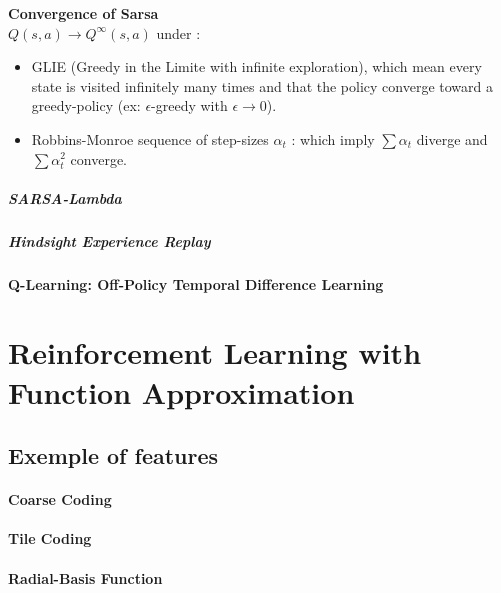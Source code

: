 			\begin{theorem}
				\textbf{Convergence of Sarsa} \\
				$Q(s, a) \rightarrow Q^\infty(s,a)$ under :
				\begin{itemize}
					\item GLIE (Greedy in the Limite with infinite exploration), which mean every state is visited infinitely many times and that the policy converge toward a greedy-policy (ex: $\epsilon$-greedy with $\epsilon\rightarrow 0$).
					\item Robbins-Monroe sequence of step-sizes $\alpha_t$ : which imply $\sum \alpha_t$ diverge and $\sum \alpha_t^2$ converge.
				\end{itemize}
			\end{theorem}

			\subparagraph*{SARSA-Lambda}
			\subparagraph*{Hindsight Experience Replay}

		\paragraph*{Q-Learning: Off-Policy Temporal Difference Learning}



\section{Reinforcement Learning with Function Approximation} %
	\label{sec:reinforcement_learning_with_function_approximation}

	\subsection{Exemple of features} %
		\label{sub:exemple_of_features}

		\paragraph*{Coarse Coding}
		\paragraph*{Tile Coding}
		\paragraph*{Radial-Basis Function}
